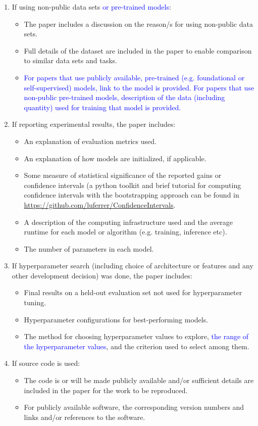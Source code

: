 \documentclass{Interspeech}
\newcommand{\blue}[1]{\textcolor{blue}{#1}}
\begin{document}
\begin{enumerate}
\item If using non-public data sets \blue{or pre-trained models}:
\begin{itemize}
\item The paper includes a discussion on the reason/s for using non-public data sets.
\item Full details of the dataset are included in the paper to enable comparison to similar data sets and tasks.
\item \blue{For papers that use publicly available, pre-trained (e.g. foundational or self-supervised) models, link to the model is provided. For papers that use non-public pre-trained models, description of the data (including quantity) used for training that model is provided.}
\end{itemize}


\item If reporting experimental results, the paper includes:
\begin{itemize}
\item An explanation of evaluation metrics used.
\item An explanation of how models are initialized, if applicable.
\item Some measure of statistical significance of the reported gains or confidence intervals (a python toolkit and brief tutorial for computing confidence intervals with the bootstrapping approach can be found in \url{https://github.com/luferrer/ConfidenceIntervals}.
\item A description of the computing infrastructure used and the average runtime for each model or algorithm (e.g. training, inference etc).
\item The number of parameters in each model.
\end{itemize}

\item If hyperparameter search (including choice of architecture or features and any other development decision) was done, the paper includes:
\begin{itemize}
\item Final results on a held-out evaluation set not used for hyperparameter tuning.
\item Hyperparameter configurations for best-performing models.
\item The method for choosing hyperparameter values to explore, \blue{the range of the hyperparameter values}, and the criterion used to select among them.
\end{itemize}

\item If source code is used:
\begin{itemize}
\item The code is or will be made publicly available and/or sufficient details are included in the paper for the work to be reproduced.
\item For publicly available software, the corresponding version numbers and links and/or references to the software.
\end{itemize}

\end{enumerate}
\end{document}
